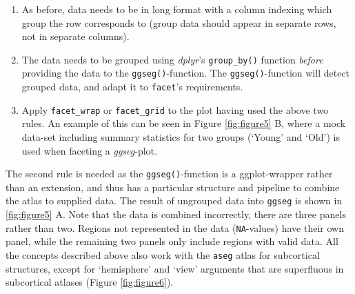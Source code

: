 \documentclass[fleqn,10pt]{wlpeerj} %
\providecommand{\tightlist}{
\setlength{\itemsep}{0pt}\setlength{\parskip}{0pt}}
\begin{document}
\begin{enumerate}
\def\labelenumi{\arabic{enumi}.}
\tightlist
\item
  As before, data needs to be in long format with a column indexing which group the row corresponds to (group data should appear in separate rows, not in separate columns).\\
\item
  The data needs to be grouped using \emph{dplyr}'s \texttt{group\_by()} function \emph{before} providing the data to the \texttt{ggseg()}-function.
  The \texttt{ggseg()}-function will detect grouped data, and adapt it to \texttt{facet}'s requirements.\\
\item
  Apply \texttt{facet\_wrap} or \texttt{facet\_grid} to the plot having used the above two rules.
  An example of this can be seen in Figure \ref{fig:figure5} B, where a mock data-set including summary statistics for two groups (`Young' and `Old') is used when faceting a \emph{ggseg}-plot.
\end{enumerate}

The second rule is needed as the \texttt{ggseg()}-function is a ggplot-wrapper rather than an extension, and thus has a particular structure and pipeline to combine the atlas to supplied data.
The result of ungrouped data into \texttt{ggseg} is shown in \ref{fig:figure5} A.
Note that the data is combined incorrectly, there are three panels rather than two.
Regions not represented in the data (\texttt{NA}-values) have their own panel, while the remaining two panels only include regions with valid data.
All the concepts described above also work with the \texttt{aseg} atlas for subcortical structures, except for `hemisphere' and `view' arguments that are superfluous in subcortical atlases (Figure \ref{fig:figure6}).
\end{document}
